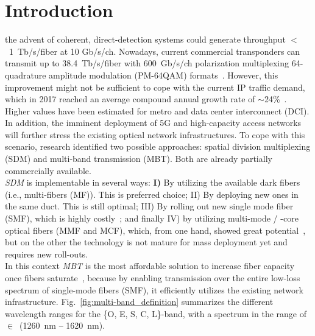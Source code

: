 \documentclass[journal]{IEEEtran}
\begin{document}
\section{Introduction}\label{Sec:Intro}
 the advent of coherent, direct-detection systems could generate throughput $<$~1~Tb/s/fiber at 10 Gb/s/ch. Nowadays, current commercial transponders can transmit up to 38.4~Tb/s/fiber with 600~Gb/s/ch polarization multiplexing 64-quadrature amplitude modulation (PM-64QAM) formats~\cite{Infinera600G}. However, this improvement might not be sufficient to cope with the current IP traffic demand, which in 2017 reached an average compound annual growth rate of $\sim$24\%~\cite{Cisco_2017}. Higher values have been estimated for metro and data center interconnect (DCI). In addition, the imminent deployment of 5G and high-capacity access networks will further stress the existing optical network infrastructures. To cope with this scenario, research identified two possible approaches: spatial division multiplexing (SDM) and multi-band transmission (MBT). Both are already partially commercially available.\\
\emph{SDM} is implementable in several ways: \textbf{I)} By utilizing the available dark fibers~\cite{winzer2018scaling} (i.e., multi-fibers (MF)). This is preferred choice; II) By deploying new ones in the same duct. This is still optimal; III) By rolling out new single mode fiber (SMF), which is highly costly~\cite{jimenez2017techno}; and finally IV) by utilizing multi-mode / -core optical fibers (MMF and MCF), which, from one hand, showed great potential~\cite{van2014ultra, kobayashi20171}, but on the other the technology is not mature for mass deployment yet and requires new roll-outs.\\
In this context \emph{MBT} is the most affordable solution to increase fiber capacity once fibers saturate~\cite{napoli2018towards}, because by enabling transmission over the entire low-loss spectrum of single-mode fibers (SMF), it efficiently utilizes the existing network infrastructure. Fig.~\ref{fig:multi-band_definition} summarizes the different wavelength ranges for the \{O, E, S, C, L\}-band, with a spectrum in the range of $\in$~(1260~nm -- 1620~nm).
\end{document}
